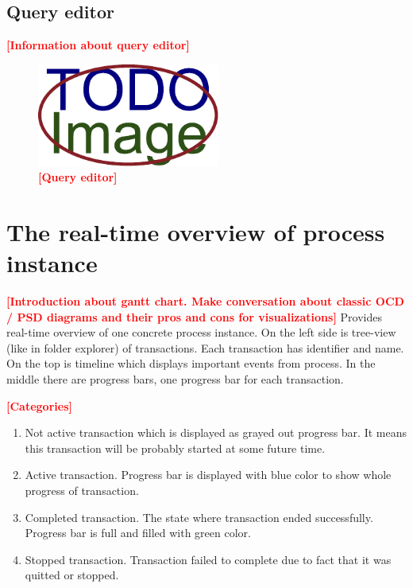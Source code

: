 \documentclass[thesis=B,english]{FITthesis}[2012/06/26]
\newcommand{\todo}[1]{\textcolor{red}{\textbf{[#1]}}}
\begin{document}
    \subsection{Query editor}
    
    \todo{Information about query editor}
    
    \begin{figure}[h]
          \centering
          \includegraphics[width=6cm,keepaspectratio]{img/TODO-image}
          \caption{\todo{Query editor}}
      \end{figure}   
    
    \section{The real-time overview of process instance}
    \todo{Introduction about gantt chart. Make conversation about classic OCD / PSD diagrams and their pros and cons for visualizations}
    Provides real-time overview of one concrete process instance.
On the left side is tree-view (like in folder explorer) of transactions. Each transaction has identifier and name.
On the top is timeline which displays important events from process.
In the middle there are progress bars, one progress bar for each transaction. 

	\todo{Categories}
    
    \begin{enumerate}[i]
    	\item Not active transaction which is displayed as grayed out progress bar. It means this transaction will be probably started at some future time.

        \item Active transaction. Progress bar is displayed with blue color to show whole progress of transaction. 
        
        \item Completed transaction. The state where transaction ended successfully. Progress bar is full and filled with green color.
        
        \item Stopped transaction. Transaction failed to complete due to fact that it was quitted or stopped.
    \end{enumerate}
    
\end{document}
